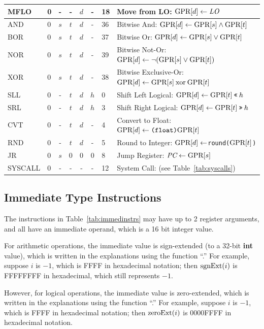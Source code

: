 \documentclass[11pt,letterpaper]{article}
\newcommand{\tabref}[1]{Table~\ref{#1}}  %
\begin{document}
\begin{table}[htbp]
\begin{tabular}{|l|l|c|c|c|c|l|p{9cm}|}
\hline
MFLO    & 0  & -  & -  & $d$ & -    & 18 & Move from LO: $\textrm{GPR[}d\textrm{]} \leftarrow \textit{LO}$ \\
\hline
AND     &  0  &$s$ &$t$ & $d$ & -    & 36 & Bitwise And: $\textrm{GPR[}d\textrm{]} \leftarrow \textrm{GPR[}s\textrm{]} \wedge \textrm{GPR[}t\textrm{]}$ \\
\hline
BOR     &  0  &$s$ &$t$ & $d$ & -    & 37 & Bitwise Or: $\textrm{GPR[}d\textrm{]} \leftarrow \textrm{GPR[}s\textrm{]} \vee \textrm{GPR[}t\textrm{]}$ \\
\hline
NOR     &  0  &$s$ &$t$ & $d$ & -    & 39 & Bitwise Not-Or: $\textrm{GPR[}d\textrm{]} \leftarrow \neg(\textrm{GPR[}s\textrm{]} \vee \textrm{GPR[}t\textrm{]})$ \\
\hline
XOR     &  0  &$s$ &$t$ & $d$ & -    & 38 & Bitwise Exclusive-Or: $\textrm{GPR[}d\textrm{]} \leftarrow \textrm{GPR[}s\textrm{]} \:\textrm{xor}\: \textrm{GPR[}t\textrm{]}$ \\
\hline
SLL     &  0  & - &$t$ & $d$ & $h$  & 0 & Shift Left Logical: $\textrm{GPR[}d\textrm{]} \leftarrow \textrm{GPR[}t\textrm{]} \:\texttt{<<}\: h$ \\
\hline
SRL     &  0  & - &$t$ & $d$ & $h$  & 3 & Shift Right Logical: $\textrm{GPR[}d\textrm{]} \leftarrow \textrm{GPR[}t\textrm{]} \:\texttt{>>}\: h$ \\
\hline
CVT     &  0 & -  &$t$ & $d$ & -    & 4 & Convert to Float: $\textrm{GPR[}d\textrm{]} \leftarrow \texttt{(float)} \textrm{GPR[}t\textrm{]}$ \\
\hline
RND     &  0 & -  &$t$ & $d$ & -    & 5 & Round to Integer: $\textrm{GPR[}d\textrm{]} \leftarrow $\texttt{round($\textrm{GPR[}t\textrm{]}$)} \\
\hline
JR      &  0  &$s$ & 0 &  0  &  0   & 8 & Jump Register: $\textit{PC} \leftarrow \textrm{GPR[}s\textrm{]}$ \\
\hline
SYSCALL &  0  & -  & - & -   & -   & 12 & System Call: (see \tabref{tab:syscalls}) \\
\hline
\end{tabular}
\end{table}

\newpage

\subsection{Immediate Type Instructions}

The instructions in \tabref{tab:immedinstrs} may have up to 2 register
arguments, and all have an immediate operand, which is a 16 bit
integer value.

For arithmetic operations, the immediate value is sign-extended (to a 32-bit
\textbf{int} value),
which is written in the explanations using the function ``{\SIGNEXTENDNAME}.'' 
For example, suppose $i$ is $-1$, which is FFFF in hexadecimal
notation;
then $\textrm{sgnExt}(i)$ is FFFFFFFF in hexadecimal, which still
represents $-1$.

However, for logical operations, the immediate value is zero-extended,
which is written in the explanations using the function ``{\ZEROEXTENDNAME}.''
For example, suppose $i$ is $-1$, which is FFFF in hexadecimal
notation;
then $\textrm{zeroExt}(i)$ is 0000FFFF in hexadecimal notation.
\end{document}
